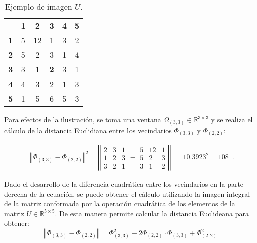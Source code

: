 \begin{table}
\begin{center}
\caption{Ejemplo de imagen $U$.}

\renewcommand{\arraystretch}{1.4}
\setlength\tabcolsep{3pt}

{
\begin{tabular}{cc|ccc|c}
 & \multicolumn{1}{c}{\textbf{1}} & \textbf{2} & \textbf{3} & \multicolumn{1}{c}{\textbf{4}} & \textbf{5}\tabularnewline
\textbf{1} & \multicolumn{1}{c}{5} & 12 & 1 & \multicolumn{1}{c}{3} & 2\tabularnewline
\cline{3-5} 
\textbf{2} & 5 & 2 & 3 & 1 & 4\tabularnewline
\textbf{3} & 3 & 1 & \textbf{2} & 3 & 1\tabularnewline
\textbf{4} & 4 & 3 & 2 & 1 & 3\tabularnewline
\cline{3-5} 
\textbf{5} & \multicolumn{1}{c}{1} & 5 & 6 & \multicolumn{1}{c}{5} & 3\tabularnewline
\end{tabular}
}
\par\end{center} \label{tab_ImageExample}
\end{table}
Para efectos de la ilustraci\'on, se toma una ventana $\Omega_{\left(3,3\right)}\in\mathbb{R}^{3\times3}$  y se realiza  el c\'alculo de la distancia Euclidiana entre los vecindarios $\varPhi_{\left(3,3\right)}$ y $\varPhi_{\left(2,2\right)}$:

\begin{equation}
\label{eq:resultado1}
\begin{array}{c}
\left\Vert \varPhi_{\left(3,3\right)}-\varPhi_{\left(2,2\right)}\right\Vert ^{2}=\left\Vert \begin{array}{ccc}
2 & 3 & 1\\
1 & 2 & 3\\
3 & 2 & 1
\end{array}-\begin{array}{ccc}
5 & 12 & 1\\
5 & 2 & 3\\
3 & 1 & 2
\end{array}\right\Vert\end{array}
=10.3923^{2}=108 \enspace .
\end{equation}



 Dado el desarrollo de la diferencia cuadr\'atica entre los vecindarios en la parte derecha de la ecuaci\'on, se puede obtener el c\'alculo utilizando la imagen integral de la matriz conformada por la operaci\'on cuadr\'atica de los elementos de la matriz $U\in\mathbb{R}^{5\times5}$. De esta manera permite calcular la distancia Euclideana para obtener: 
\begin{equation}
\left\Vert \varPhi_{\left(3,3\right)}-\varPhi_{\left(2,2\right)}\right\Vert =\varPhi_{\left(3,3\right)}^{2}-2\varPhi_{\left(2,2\right)}\cdot\varPhi_{\left(3,3\right)}+\varPhi_{\left(2,2\right)}^{2} 
\end{equation}


